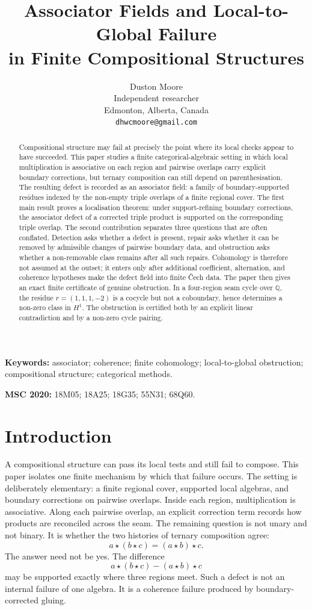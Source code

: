 \documentclass[11pt]{article}
\title{Associator Fields and Local-to-Global Failure\\ in Finite Compositional Structures}
\author{Duston Moore\\Independent researcher\\Edmonton, Alberta, Canada\\\texttt{dhwcmoore@gmail.com}}
\date{}
\newcommand{\Q}{\mathbb{Q}}
\begin{document}
\maketitle

\begin{abstract}
Compositional structure may fail at precisely the point where its local checks appear to have succeeded. This paper studies a finite categorical-algebraic setting in which local multiplication is associative on each region and pairwise overlaps carry explicit boundary corrections, but ternary composition can still depend on parenthesisation. The resulting defect is recorded as an associator field: a family of boundary-supported residues indexed by the non-empty triple overlaps of a finite regional cover. The first main result proves a localisation theorem: under support-refining boundary corrections, the associator defect of a corrected triple product is supported on the corresponding triple overlap. The second contribution separates three questions that are often conflated. Detection asks whether a defect is present, repair asks whether it can be removed by admissible changes of pairwise boundary data, and obstruction asks whether a non-removable class remains after all such repairs. Cohomology is therefore not assumed at the outset; it enters only after additional coefficient, alternation, and coherence hypotheses make the defect field into finite \v{C}ech data. The paper then gives an exact finite certificate of genuine obstruction. In a four-region seam cycle over \(\Q\), the residue \(r=(1,1,1,-2)\) is a cocycle but not a coboundary, hence determines a non-zero class in \(H^1\). The obstruction is certified both by an explicit linear contradiction and by a non-zero cycle pairing.
\end{abstract}

\noindent\textbf{Keywords:} associator; coherence; finite cohomology; local-to-global obstruction; compositional structure; categorical methods.

\medskip

\noindent\textbf{MSC 2020:} 18M05; 18A25; 18G35; 55N31; 68Q60.



\section{Introduction}

A compositional structure can pass its local tests and still fail to compose. This paper isolates one finite mechanism by which that failure occurs. The setting is deliberately elementary: a finite regional cover, supported local algebras, and boundary corrections on pairwise overlaps. Inside each region, multiplication is associative. Along each pairwise overlap, an explicit correction term records how products are reconciled across the seam. The remaining question is not unary and not binary. It is whether the two histories of ternary composition agree:
\[
a \star (b \star c)=(a \star b)\star c .
\]
The answer need not be yes. The difference
\[
a \star (b \star c)-(a \star b)\star c
\]
may be supported exactly where three regions meet. Such a defect is not an internal failure of one algebra. It is a coherence failure produced by boundary-corrected gluing.
\end{document}
